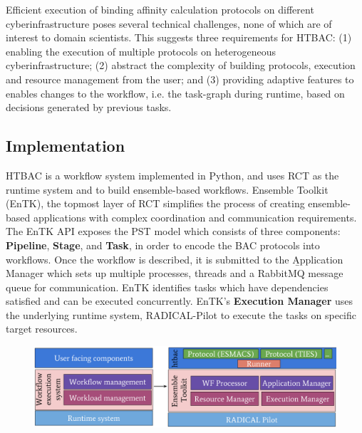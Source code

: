 Efficient execution of binding affinity calculation protocols on different
cyberinfrastructure poses several technical challenges, none of which are of
interest to domain scientists. This suggests three requirements for HTBAC\@:
(1) enabling the execution of multiple protocols on heterogeneous
cyberinfrastructure; (2) abstract the complexity of building protocols,
execution and resource management from the user; and (3) providing adaptive
features to enables changes to the workflow, i.e. the task-graph during
runtime, based on decisions generated by previous tasks.


\subsection{Implementation}


HTBAC is a workflow system implemented in Python, and uses RCT as the runtime
system and to build ensemble-based workflows. Ensemble Toolkit (EnTK), the
topmost layer of RCT simplifies the process of creating ensemble-based
applications with complex coordination and communication requirements. The
EnTK API exposes the PST model which consists of three components:
\textbf{Pipeline}, \textbf{Stage}, and \textbf{Task}, in order to encode the
BAC protocols into workflows. Once the workflow is described, it is submitted
to the \b{Application Manager} which sets up multiple processes, threads and a
RabbitMQ message queue for communication. EnTK identifies tasks which have
dependencies satisfied and can be executed concurrently. EnTK's
\textbf{Execution Manager} uses the underlying runtime system, RADICAL-Pilot
to execute the tasks on specific target resources.


\begin{figure}
  \centering
   \includegraphics[width=\columnwidth]{figures/isc_htbac_integration_with_entk_RP.pdf}
  \caption{}
\label{fig:weak_scaling}
\end{figure}

